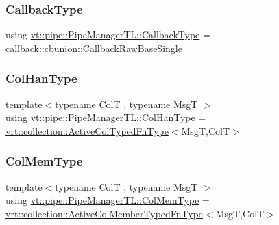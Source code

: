 \subsubsection{\texorpdfstring{Callback\+Type}{CallbackType}}
{\footnotesize\ttfamily using \hyperlink{structvt_1_1pipe_1_1_pipe_manager_t_l_a1cc1d0f1c80a36488f9b5d282e9755d2}{vt\+::pipe\+::\+Pipe\+Manager\+T\+L\+::\+Callback\+Type} =  \hyperlink{structvt_1_1pipe_1_1callback_1_1cbunion_1_1_callback_raw_base_single}{callback\+::cbunion\+::\+Callback\+Raw\+Base\+Single}}

\mbox{\label{structvt_1_1pipe_1_1_pipe_manager_t_l_a0bf4e2e805b3ce2be9f499e0e39aadfa}} 
\subsubsection{\texorpdfstring{Col\+Han\+Type}{ColHanType}}
{\footnotesize\ttfamily template$<$typename ColT , typename MsgT $>$ \\
using \hyperlink{structvt_1_1pipe_1_1_pipe_manager_t_l_a0bf4e2e805b3ce2be9f499e0e39aadfa}{vt\+::pipe\+::\+Pipe\+Manager\+T\+L\+::\+Col\+Han\+Type} =  \hyperlink{namespacevt_1_1vrt_1_1collection_a939327f58a5838cf9d7dcc7f14d1670c}{vrt\+::collection\+::\+Active\+Col\+Typed\+Fn\+Type}$<$MsgT,ColT$>$}

\mbox{\label{structvt_1_1pipe_1_1_pipe_manager_t_l_abf7ad21be4f3d0db51d643aa8ea959cc}} 
\subsubsection{\texorpdfstring{Col\+Mem\+Type}{ColMemType}}
{\footnotesize\ttfamily template$<$typename ColT , typename MsgT $>$ \\
using \hyperlink{structvt_1_1pipe_1_1_pipe_manager_t_l_abf7ad21be4f3d0db51d643aa8ea959cc}{vt\+::pipe\+::\+Pipe\+Manager\+T\+L\+::\+Col\+Mem\+Type} =  \hyperlink{namespacevt_1_1vrt_1_1collection_a87925616c03cf4ccc548d33b2fe172ee}{vrt\+::collection\+::\+Active\+Col\+Member\+Typed\+Fn\+Type}$<$MsgT,ColT$>$}

